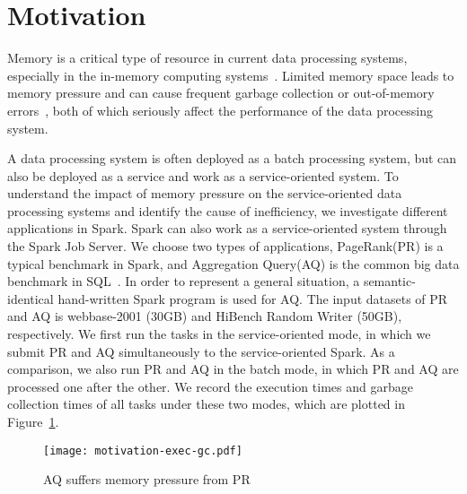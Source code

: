 \section{Motivation}
\label{sec:motivation}

Memory is a critical type of resource in current data processing systems, especially in the in-memory computing systems~\cite{shi:mammoth}. Limited memory space leads to memory pressure and can cause frequent garbage collection or out-of-memory errors~\cite{fang2015interruptible}, both of which seriously affect the performance of the data processing system.

A data processing system is often deployed as a batch processing system, but can also be deployed as a service and work as a service-oriented system. To understand the impact of memory pressure on the service-oriented data processing systems and identify the cause of inefficiency, we investigate different applications in Spark. Spark can also work as a service-oriented system through the Spark Job Server. We choose two types of applications, PageRank(PR)  
is a typical benchmark in Spark, and Aggregation Query(AQ) is the common big data benchmark in SQL~\cite{www:benchmark}. In order to represent a general situation, a semantic-identical hand-written Spark program is used for AQ. The input datasets of PR and AQ is webbase-2001 (30GB) and HiBench Random Writer (50GB), respectively. We first run the tasks in the service-oriented mode, in which we submit PR and AQ simultaneously to the service-oriented Spark.
As a comparison, we also run PR and AQ in the batch mode, in which PR and AQ are processed one after the other. We record the execution times and garbage collection times of all tasks under these two modes, which are plotted in Figure~\ref{fig:memorypressure}. 

\begin{figure}[!t]
\centering
\texttt{[image: motivation-exec-gc.pdf]}
\vspace{-2mm}
\caption{AQ suffers memory pressure from PR}
\vspace{-6mm}
\label{fig:memorypressure}
\end{figure}

